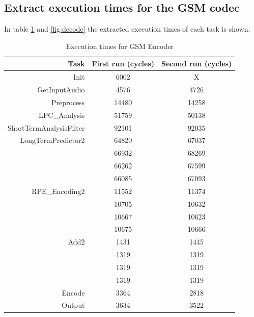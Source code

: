 \documentclass[a4paper, 12pt]{article}
\begin{document}
\subsection{Extract execution times for the GSM codec}
In table \ref{fig:encode} and \ref{fig:decode} the extracted execution
times of each task is shown. 
\begin{table}[h]
  \centering
  \begin{tabular}{r c c}
    \hline
    Task & First run (cycles) & Second run (cycles) \\
    \hline
    Init & 6002  & X \\
    GetInputAudio & 4576  & 4726 \\
    Preprocess & 14480  & 14258  \\
    LPC\_Analysis & 51759  & 50138 \\
    ShortTermAnalysisFilter & 92101 & 92035 \\
    LongTermPredictor2 &64820&67037\\
                       &66932&68269\\
                       &66262&67599\\
                       &66085&67093\\
    RPE\_Encoding2 &11552&11374\\
                   &10705&10632\\
                   &10667&10623\\
                   &10675&10666\\
    Add2 &1431&1445\\
         &1319&1319\\
         &1319&1319\\
         &1319&1319\\
    Encode & 3364 & 2818 \\
    Output & 3634 & 3522 \\
  \end{tabular}
  \caption{Execution times for GSM Encoder}
  \label{fig:encode}
\end{table}
\end{document}
